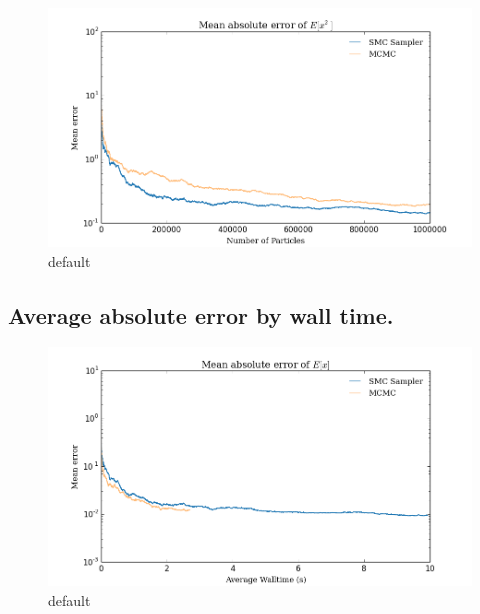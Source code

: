 \documentclass[12pt]{elsarticle}
\begin{document}
\begin{figure}[htbp]
\begin{center}
\includegraphics[width = \textwidth]{plots/E_X2.png}
\caption{default}
\label{default}
\end{center}
\end{figure}

\subsection*{Average absolute error by wall time. }

\begin{figure}[htbp]
\begin{center}
\includegraphics[width = \textwidth]{plots/E_X_walltime.png}
\caption{default}
\label{default}
\end{center}
\end{figure}
\end{document}
